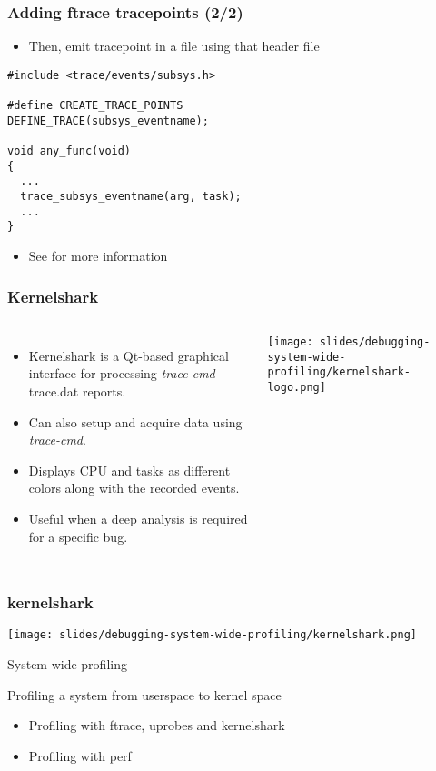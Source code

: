 \begin{frame}[fragile]
  \frametitle{Adding ftrace tracepoints (2/2)}
  \begin{itemize}
    \item Then, emit tracepoint in a  file using that header file
  \end{itemize}
  \begin{block}{}
    \begin{verbatim}
#include <trace/events/subsys.h>

#define CREATE_TRACE_POINTS
DEFINE_TRACE(subsys_eventname);

void any_func(void)
{
  ...
  trace_subsys_eventname(arg, task);
  ...
}
    \end{verbatim}
  \end{block}
  \begin{itemize}
    \item See  for more information
  \end{itemize}
\end{frame}

\begin{frame}[fragile]
  \frametitle{Kernelshark}
  \begin{columns}
    \begin{itemize}
      \item Kernelshark is a Qt-based graphical interface for processing
            {\em trace-cmd} trace.dat reports.
      \item Can also setup and acquire data using {\em trace-cmd}.
      \item Displays CPU and tasks as different colors along with the recorded
            events.
      \item Useful when a deep analysis is required for a specific bug.
    \end{itemize}
    \vspace{0.5cm}
    \center\texttt{[image: slides/debugging-system-wide-profiling/kernelshark-logo.png]}
  \end{columns}
\end{frame}

\begin{frame}
  \frametitle{kernelshark}
  \center\texttt{[image: slides/debugging-system-wide-profiling/kernelshark.png]}
\end{frame}

\setuplabframe
{System wide profiling}
{
  Profiling a system from userspace to kernel space
  \begin{itemize}
    \item Profiling with ftrace, uprobes and kernelshark
    \item Profiling with perf
  \end{itemize}
}

